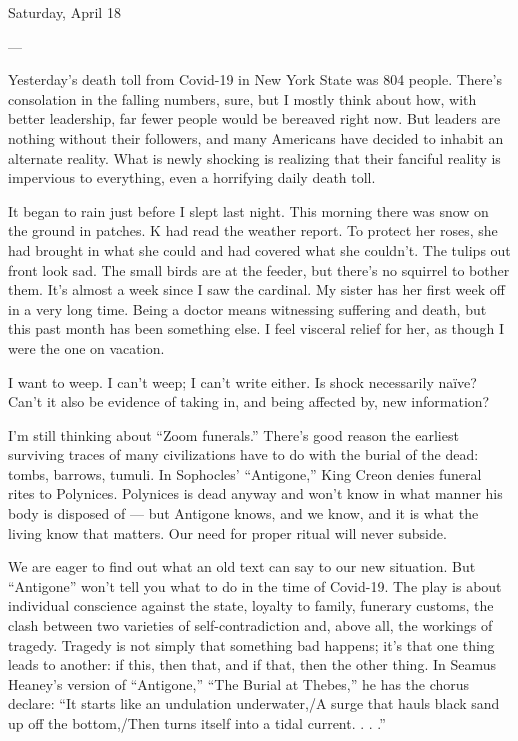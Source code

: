Saturday, April 18

---

Yesterday's death toll from Covid-19 in New York State was 804 people.
There's consolation in the falling numbers, sure, but I mostly think
about how, with better leadership, far fewer people would be bereaved
right now. But leaders are nothing without their followers, and many
Americans have decided to inhabit an alternate reality. What is newly
shocking is realizing that their fanciful reality is impervious to
everything, even a horrifying daily death toll.

It began to rain just before I slept last night. This morning there was
snow on the ground in patches. K had read the weather report. To protect
her roses, she had brought in what she could and had covered what she
couldn't. The tulips out front look sad. The small birds are at the
feeder, but there's no squirrel to bother them. It's almost a week since
I saw the cardinal. My sister has her first week off in a very long
time. Being a doctor means witnessing suffering and death, but this past
month has been something else. I feel visceral relief for her, as though
I were the one on vacation.

I want to weep. I can't weep; I can't write either. Is shock necessarily
naïve? Can't it also be evidence of taking in, and being affected by,
new information?

I'm still thinking about ``Zoom funerals.'' There's good reason the
earliest surviving traces of many civilizations have to do with the
burial of the dead: tombs, barrows, tumuli. In Sophocles' ``Antigone,''
King Creon denies funeral rites to Polynices. Polynices is dead anyway
and won't know in what manner his body is disposed of --- but Antigone
knows, and we know, and it is what the living know that matters. Our
need for proper ritual will never subside.

We are eager to find out what an old text can say to our new situation.
But ``Antigone'' won't tell you what to do in the time of Covid-19. The
play is about individual conscience against the state, loyalty to
family, funerary customs, the clash between two varieties of
self-contradiction and, above all, the workings of tragedy. Tragedy is
not simply that something bad happens; it's that one thing leads to
another: if this, then that, and if that, then the other thing. In
Seamus Heaney's version of ``Antigone,'' ``The Burial at Thebes,'' he
has the chorus declare: ``It starts like an undulation underwater,/A
surge that hauls black sand up off the bottom,/Then turns itself into a
tidal current. . . .''

